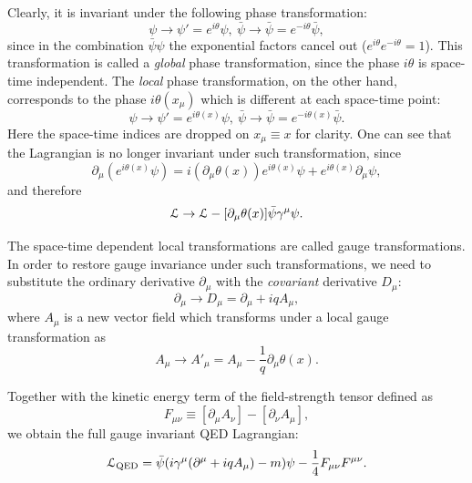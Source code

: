 Clearly, it is invariant under the following phase transformation:
\begin{equation}
\psi \rightarrow \psi' = e^{i \theta} \psi, ~\bar{\psi} \rightarrow \bar{\psi} = e^{-i \theta} \bar{\psi},
\end{equation}
since in the combination $\bar{\psi}\psi$ the exponential factors cancel out ($e^{i \theta} e^{-i \theta} = 1$). This
transformation is called a \textit{global} phase transformation, since the phase $i \theta$ is space-time independent.
The \textit{local} phase transformation, on the other hand, corresponds to the phase $i \theta(x_\mu)$ which is
different at each space-time point:
\begin{equation}
\psi \rightarrow \psi' = e^{i \theta(x)} \psi, ~\bar{\psi} \rightarrow \bar{\psi} = e^{-i \theta(x)} \bar{\psi}.
\end{equation}
Here the space-time indices are dropped on $x_\mu \equiv x$ for clarity. One can see that the Lagrangian is no longer
invariant under such transformation, since
\begin{equation}
\partial_\mu (e^{i \theta(x)} \psi) = i (\partial_\mu \theta(x))  e^{i \theta(x)} \psi + e^{i \theta(x)} \partial_\mu \psi,
\end{equation}
and therefore
\begin{equation}
\mathcal{L} \rightarrow \mathcal{L} - [\partial_\mu \theta(x)] \bar{\psi} \gamma^\mu \psi.
\end{equation}

The space-time dependent local transformations are called gauge transformations. In order to restore gauge invariance
under such transformations, we need to substitute the ordinary derivative $\partial_\mu$ with the \textit{covariant}
derivative $D_\mu$:
\begin{equation}
\partial_\mu \rightarrow D_\mu = \partial_\mu + i q A_\mu,
\end{equation}
where $A_\mu$ is a new vector field which transforms under a local gauge transformation as
\begin{equation}
A_\mu \rightarrow A'_\mu = A_\mu - \frac{1}{q} \partial_\mu \theta(x).
\end{equation}

Together with the kinetic energy term of the field-strength tensor defined as
\begin{equation}
\label{eq:F_mu_nu}
F_{\mu\nu} \equiv [\partial_\mu A_\nu] - [\partial_\nu A_\mu],
\end{equation}
we obtain the full gauge invariant QED Lagrangian:
\begin{equation}
\mathcal{L}_\textrm{QED} = \bar{\psi}(i \gamma^\mu (\partial^\mu + i q A_\mu) - m) \psi - \frac{1}{4}F_{\mu\nu} F^{\mu\nu}.
\end{equation}

